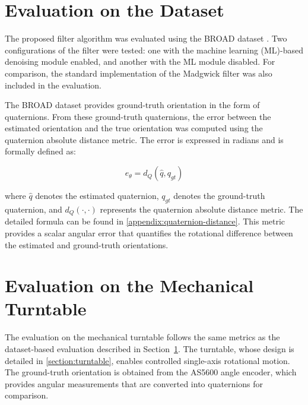 \documentclass{iutbscthesis}
\begin{document}
\section{Evaluation on the Dataset}\label{sec:eval_on_dataset}

The proposed filter algorithm was evaluated using the BROAD dataset \cite{BROAD}. Two configurations of the filter were tested: one with the machine learning (ML)-based denoising module enabled, and another with the ML module disabled. For comparison, the standard implementation of the Madgwick filter \cite{madgwick2011estimation} was also included in the evaluation.  

The BROAD dataset provides ground-truth orientation in the form of quaternions. From these ground-truth quaternions, the error between the estimated orientation and the true orientation was computed using the quaternion absolute distance metric. The error is expressed in radians and is formally defined as:

\begin{equation}
    \label{eq:quat_error}
    e_{\theta} = d_{Q}\left(\hat{q}, q_{gt}\right)
\end{equation}

where $\hat{q}$ denotes the estimated quaternion, $q_{gt}$ denotes the ground-truth quaternion, and $d_{Q}(\cdot,\cdot)$ represents the quaternion absolute distance metric. The detailed formula can be found in \autoref{appendix:quaternion-distance}. This metric provides a scalar angular error that quantifies the rotational difference between the estimated and ground-truth orientations.

\section{Evaluation on the Mechanical Turntable}

The evaluation on the mechanical turntable follows the same metrics as the dataset-based evaluation described in Section~\ref{sec:eval_on_dataset}. The turntable, whose design is detailed in \autoref{section:turntable}, enables controlled single-axis rotational motion. The ground-truth orientation is obtained from the AS5600 angle encoder, which provides angular measurements that are converted into quaternions for comparison.  
\end{document}
